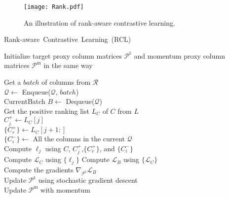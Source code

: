 \begin{figure}
  \centering
  \texttt{[image: Rank.pdf]} \vspace{-7mm}
  \caption{An illustration of rank-aware contrastive learning.}
  \label{fig:rank}
  \vspace{-1mm}
\end{figure}




\begin{algorithm}[!tb]

	\small
	\LinesNumbered
	\caption{\protect\mbox {\textsf{Rank-aware Contrastive Learning (RCL)}}}
 \label{algo:algo1}
	Initialize target proxy column matrices  $\mathcal{P}^\text{t}$ and momentum proxy column matrices $\mathcal{P}^\text{m}$ in the same way\\
    {     Get a $batch$ of columns from $\mathcal{R}$\\
	   $\mathcal{Q} \leftarrow$ Enqueue($\mathcal{Q}$, $batch$) \\
           {
              CurrentBatch $B \leftarrow$ Dequeue($\mathcal{Q}$)\\
              {     Get the positive ranking list $L_C$ of $C$ from $L$\\
                   { 
                     $C_j^+ \leftarrow L_C\left[j\right]$\\
                     $\{C_r^+\} \leftarrow L_C\left[j+1:\right]$\\
                     $\{C_i^-\} \leftarrow$ All the columns in the current $\mathcal{Q}$\\
                     Compute $\ell_j$ using $C$, $C_j^+$,$\{C_r^+\}$, and $\{C_i^-\}$ \\
                   }
                   Compute $\mathcal{L}_C$ using $\{\ell_j\}$
              }
              Compute $\mathcal{L}_B$ using $\{\mathcal{L}_C\}$\\
              Compute the gradients $\nabla_{{\mathcal{P}}^\text{t}}\mathcal{L}_B$\\
              Update $\mathcal{P}^\text{t}$ using stochastic gradient descent\\
              Update $\mathcal{P}^\text{m}$ with momentum\\
              
           }
	
	}
  
\end{algorithm}


